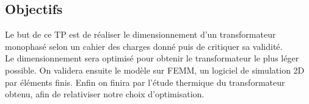 \subsection{Objectifs}
Le but de ce TP est de réaliser le dimensionnement d'un transformateur monophasé selon un cahier des charges donné puis de critiquer sa validité.\\
Le dimensionnement sera optimisé pour obtenir le transformateur le plus léger possible. On validera ensuite le modèle sur FEMM, un logiciel de simulation 2D par éléments finis. Enfin on finira par l'étude thermique du transformateur obtenu, afin de relativiser notre choix d'optimisation.\\ %


